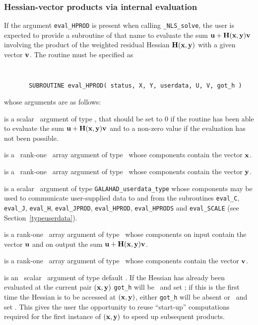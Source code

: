 \documentclass{galahad}
\newcommand{\packagename}{NLS}
\newcommand{\fullpackagename}{\libraryname\_\packagename}
\newcommand{\solver}{{\tt \fullpackagename\_solve}}
\begin{document}

\subsubsection{Hessian-vector products via internal evaluation\label{hvfv}}

If the argument {\tt eval\_HPROD} is present when calling \solver, the
user is expected to provide a subroutine of that name to evaluate the
sum ${\mathbf{u}} + {\mathbf{H}}({\mathbf{x}},{\mathbf{y}}) {\mathbf{v}}$ involving the
product of the weighted residual Hessian ${\mathbf{H}}({\mathbf{x}},{\mathbf{y}})$
with a given vector ${\mathbf{v}}$.
The routine must be specified as

\def\baselinestretch{0.8}
{\tt
\begin{verbatim}
       SUBROUTINE eval_HPROD( status, X, Y, userdata, U, V, got_h )
\end{verbatim} }
\def\baselinestretch{1.0}
\noindent whose arguments are as follows:

\begin{description}
 is a scalar \intentout\ argument of type \integer,
that should be set to 0 if the routine has been able to evaluate the
sum ${\mathbf{u}} + {\mathbf{H}}({\mathbf{x}},{\mathbf{y}}){\mathbf{v}}$
and to a non-zero value if the evaluation has not been possible.

 is a \ rank-one \intentin\ array argument of type
\realdp\ whose components contain the vector ${\mathbf{x}}$.

 is a \ rank-one \intentin\ array argument of type
\realdp\ whose components contain the vector ${\mathbf{y}}$.

 is a scalar \intentinout\ argument of type
{\tt GALAHAD\_userdata\_type} whose components may be used
to communicate user-supplied data to and from the subroutines
{\tt eval\_C}, {\tt eval\_J}, {\tt eval\_H}, {\tt eval\_JPROD},
{\tt eval\_HPROD}, {\tt eval\_HPRODS} and {\tt eval\_SCALE}
(see Section~\ref{typeuserdata}).

 is a rank-one \intentinout\ array argument of type \realdp\
whose components on input contain the vector ${\mathbf{u}}$ and on output the
sum ${\mathbf{u}} + {\mathbf{H}}({\mathbf{x}},{\mathbf{y}}) {\mathbf{v}}$.

 is a rank-one \intentin\ array argument of type \realdp\
whose components contain the vector ${\mathbf{v}}$.

 is an \optional\ scalar \intentin\ argument of type default
\logical. If the Hessian has already been evaluated at the current pair
$({\mathbf{x}},{\mathbf{y}})$
{\tt got\_h} will be \present\ and set \true; if this is the first time
the Hessian is to be accessed at $({\mathbf{x}},{\mathbf{y}})$, either {\tt got\_h} will
be absent or \present\ and set \false. This gives the user the opportunity
to reuse ``start-up'' computations required for the first instance of
$({\mathbf{x}},{\mathbf{y}})$ to speed up subsequent products.

\end{description}
\end{document}
